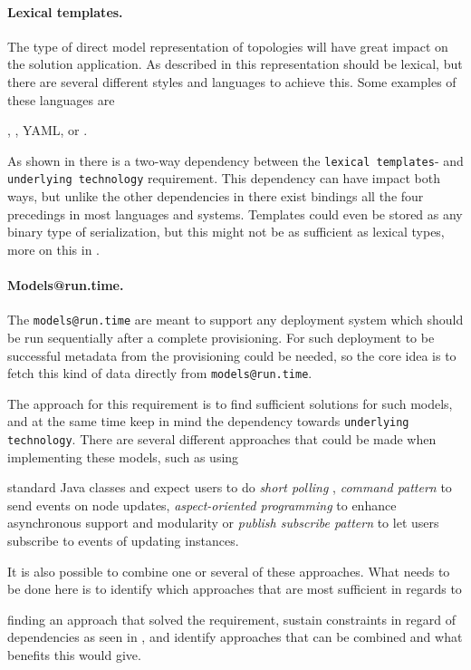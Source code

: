 \paragraph{Lexical templates.}

The type of direct model representation of topologies will have great impact 
on the solution application.
As described in  this representation should be lexical,
but there are several different styles and languages to achieve this.
Some examples of these languages are 
\begin{ii}
  \iitem {},
  \iitem {},
  \iitem YAML,
  \iitem {} or
  \iitem {}.
\end{ii}
As shown in  there is a two-way dependency between 
the \texttt{lexical templates}- and \texttt{underlying technology} requirement.
This dependency can have impact both ways, but unlike the other dependencies in
 there exist bindings all the four precedings in
most languages and systems.
Templates could even be stored as any binary type of serialization, 
but this might not be as sufficient as lexical types, more on this
in .

\paragraph{Models@run.time.}

The \texttt{models@run.time} are meant to support any deployment system which should
be run sequentially after a complete provisioning.
For such deployment to be successful metadata from the provisioning could be needed,
so the core idea is to fetch this kind of data directly from \texttt{models@run.time}.

The approach for this requirement is to find sufficient solutions for such models,
and at the same time keep in mind the dependency towards \texttt{underlying technology}.
There are several different approaches that could be made when implementing 
these models, such as using
\begin{ii}
  \iitem standard Java classes and expect users to do \emph{short polling} ,
  \iitem \emph{command pattern} to send events on node updates,
  \iitem \emph{aspect-oriented programming} to enhance asynchronous support and modularity or
  \iitem \emph{publish subscribe pattern} to let users subscribe to events of updating instances.
\end{ii}
It is also possible to combine one or several of these approaches.
What needs to be done here is to identify which approaches that are most sufficient 
in regards to 
\begin{ii} 
  \iitem finding an approach that solved the requirement,
  \iitem sustain constraints in regard of dependencies as seen in , and
  \iitem identify approaches that can be combined and what benefits this would give.
\end{ii} 

